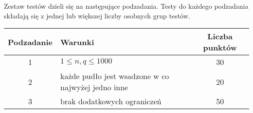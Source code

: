 \documentclass[10pt]{article}
\begin{document}
    Zestaw testów dzieli się na następujące podzadania. Testy do każdego podzadania składają się z jednej lub większej liczby osobnych grup testów.
    
    \begin{center}
        \begin{tabular}{ |c|p{9cm}|c| }
            \hline
            \textbf{Podzadanie} & \textbf{Warunki} & \textbf{Liczba punktów}\\
            \hline
            1 & $1 \leq n, q \leq 1000$ & 30\\
            \hline
            2 & każde pudło jest wsadzone w co najwyżej jedno inne & 20\\
            \hline
            3 & brak dodatkowych ograniczeń & 50\\
            \hline
        \end{tabular}
    \end{center}
\end{document}
